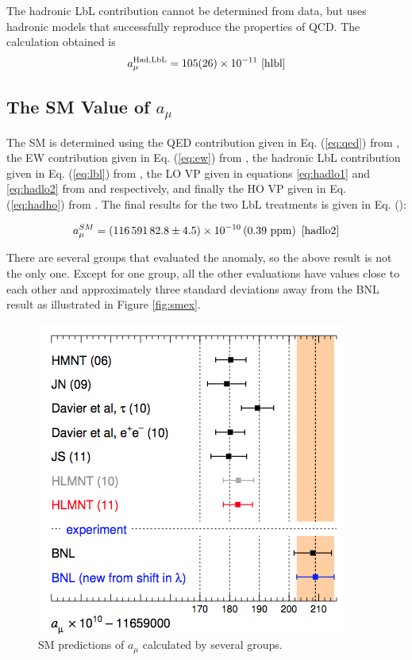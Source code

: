 \documentclass{outhesis}
\begin{document}
The hadronic LbL contribution cannot be determined from data, but uses hadronic models that successfully reproduce the properties of QCD. The calculation obtained is 
\begin{equation}
a_{\mu}^{\text{Had,LbL}} = 105(26) \times 10^{-11} \,\,\cite{hlbl} 
\label{eq:hlbl}
\end{equation}

\subsection{The SM Value of $a_{\mu}$ }

The SM is determined using the QED contribution given in Eq. (\ref{eq:qed}) from \cite{qed}, the EW contribution given in Eq. (\ref{eq:ew}) from \cite{ew}, the hadronic LbL contribution given in Eq. (\ref{eq:lbl}) from \cite{hlbl}, the LO VP given in equations \ref{eq:hadlo1} and \ref{eq:hadlo2} from \cite{hadlo1} and \cite{hadlo2} respectively, and finally the HO VP given in Eq. (\ref{eq:hadho}) from \cite{hadlo2}. The final results for the two LbL treatments is given in Eq. (\label{eq:sm}):

\begin{equation}
a_{\mu}^{SM} = \left(116\, 591\, 82.8 \pm 4.5\right) \times 10^{-10} \left(0.39  \text{ ppm}\right)  \,\,\cite{hadlo2}
\label{eq:sm}
\end{equation}

There are several groups that evaluated the anomaly, so the above result is not the only one. Except for one group, all the other evaluations have values close to each other and approximately three standard deviations away from the BNL result as illustrated in Figure \ref{fig:smex}.

\begin{figure}
  \centering
  \includegraphics[scale=0.5]{figures/smex}
   \caption{SM predictions of $a_{\mu}$ calculated by several groups. \cite{hadlo2}}
  \label{fig:had}
\end{figure}
\end{document}
